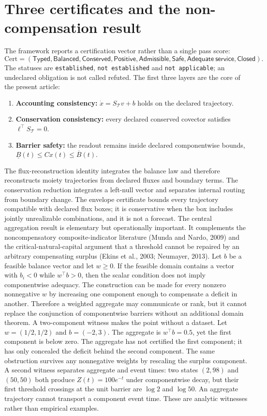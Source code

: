 \documentclass[11pt]{article}
\begin{document}
\section{Three certificates and the non-compensation result}
The framework reports a certification vector rather than a single pass score:
\[\mathrm{Cert}=(\mathsf{Typed},\mathsf{Balanced},\mathsf{Conserved},\mathsf{Positive},\mathsf{Admissible},\mathsf{Safe},\mathsf{Adequate\ service},\mathsf{Closed}).\]
The statuses are \texttt{established}, \texttt{not established} and \texttt{not applicable}; an undeclared obligation is not called refuted. The first three layers are the core of the present article:
\begin{enumerate}
\item \textbf{Accounting consistency:} \(\dot x=S_{\mathcal T}v+b\) holds on the declared trajectory.
\item \textbf{Conservation consistency:} every declared conserved covector satisfies \(\ell^\top S_{\mathcal T}=0\).
\item \textbf{Barrier safety:} the readout remains inside declared componentwise bounds, \(\underline B(t)\le Cx(t)\le\overline B(t)\).
\end{enumerate}
The flux-reconstruction identity integrates the balance law and therefore reconstructs moiety trajectories from declared fluxes and boundary terms. The conservation reduction integrates a left-null vector and separates internal routing from boundary change. The envelope certificate bounds every trajectory compatible with declared flux boxes; it is conservative when the box includes jointly unrealizable combinations, and it is not a forecast.
The central aggregation result is elementary but operationally important. It complements the noncompensatory composite-indicator literature (Munda and Nardo, 2009) and the critical-natural-capital argument that a threshold cannot be repaired by an arbitrary compensating surplus (Ekins et al., 2003; Neumayer, 2013). Let \(b\) be a feasible balance vector and let \(w\ge0\). If the feasible domain contains a vector with \(b_i<0\) while \(w^\top b>0\), then the scalar condition does not imply componentwise adequacy. The construction can be made for every nonzero nonnegative \(w\) by increasing one component enough to compensate a deficit in another. Therefore a weighted aggregate may communicate or rank, but it cannot replace the conjunction of componentwise barriers without an additional domain theorem.
A two-component witness makes the point without a dataset. Let \(w=(1/2,1/2)\) and \(b=(-2,3)\). The aggregate is \(w^\top b=0.5\), yet the first component is below zero. The aggregate has not certified the first component; it has only concealed the deficit behind the second component. The same obstruction survives any nonnegative weights by rescaling the surplus component. A second witness separates aggregate and event times: two states \((2,98)\) and \((50,50)\) both produce \(Z(t)=100e^{-t}\) under componentwise decay, but their first threshold crossings at the unit barrier are \(\log 2\) and \(\log 50\). An aggregate trajectory cannot transport a component event time. These are analytic witnesses rather than empirical examples.
\end{document}
